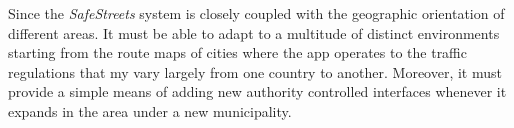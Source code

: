 Since the \emph{SafeStreets} system is closely coupled with the geographic orientation of different areas. It must be able to adapt to a multitude of distinct environments starting from the route maps of cities where the app operates to the traffic regulations that my vary largely from one country to another. Moreover, it must provide a simple means of adding new authority controlled interfaces whenever it expands in the area under a new municipality.